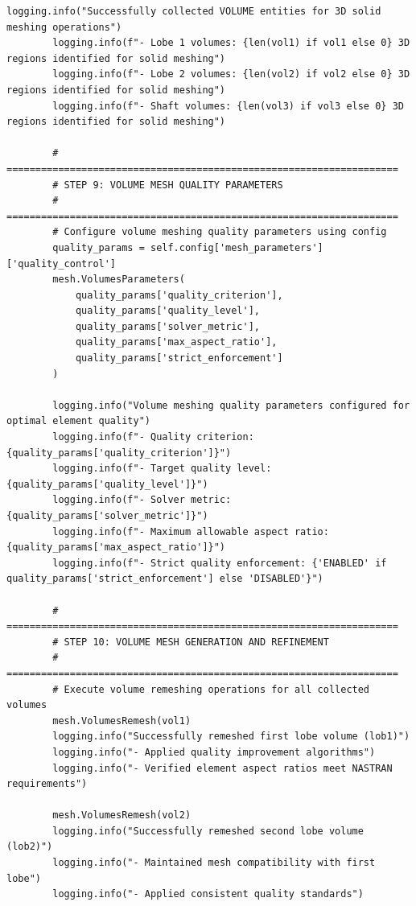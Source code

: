 \documentclass{book}
\begin{document}
\begin{itemize}[leftmargin=*,label=\textbullet]
\begin{itemize}
\begin{lstlisting}[caption={Phase 1 Meshing Automation Script},label={lst:phase1}]
        logging.info("Successfully collected VOLUME entities for 3D solid meshing operations")
        logging.info(f"- Lobe 1 volumes: {len(vol1) if vol1 else 0} 3D regions identified for solid meshing")
        logging.info(f"- Lobe 2 volumes: {len(vol2) if vol2 else 0} 3D regions identified for solid meshing")
        logging.info(f"- Shaft volumes: {len(vol3) if vol3 else 0} 3D regions identified for solid meshing")
        
        # ====================================================================
        # STEP 9: VOLUME MESH QUALITY PARAMETERS
        # ====================================================================
        # Configure volume meshing quality parameters using config
        quality_params = self.config['mesh_parameters']['quality_control']
        mesh.VolumesParameters(
            quality_params['quality_criterion'],
            quality_params['quality_level'],
            quality_params['solver_metric'],
            quality_params['max_aspect_ratio'],
            quality_params['strict_enforcement']
        )
        
        logging.info("Volume meshing quality parameters configured for optimal element quality")
        logging.info(f"- Quality criterion: {quality_params['quality_criterion']}")
        logging.info(f"- Target quality level: {quality_params['quality_level']}")
        logging.info(f"- Solver metric: {quality_params['solver_metric']}")
        logging.info(f"- Maximum allowable aspect ratio: {quality_params['max_aspect_ratio']}")
        logging.info(f"- Strict quality enforcement: {'ENABLED' if quality_params['strict_enforcement'] else 'DISABLED'}")
        
        # ====================================================================
        # STEP 10: VOLUME MESH GENERATION AND REFINEMENT
        # ====================================================================
        # Execute volume remeshing operations for all collected volumes
        mesh.VolumesRemesh(vol1)
        logging.info("Successfully remeshed first lobe volume (lob1)")
        logging.info("- Applied quality improvement algorithms")
        logging.info("- Verified element aspect ratios meet NASTRAN requirements")
        
        mesh.VolumesRemesh(vol2)
        logging.info("Successfully remeshed second lobe volume (lob2)")
        logging.info("- Maintained mesh compatibility with first lobe")
        logging.info("- Applied consistent quality standards")
        

\end{lstlisting}
\end{itemize}
\end{itemize}
\end{document}
